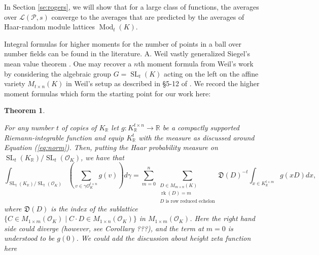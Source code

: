 \documentclass{amsart}
\newtheorem{theorem}{Theorem}
\newcommand{\OK}{\mathcal{O}_K}
\DeclareMathOperator{\SL}{SL}
\DeclareMathOperator{\ML}{Mod}
\DeclareMathOperator{\rank}{rk}
\newcommand{\nihar}{\color{red}}
\begin{document}
In Section \ref{se:rogers}, we will show that for a large class of functions, the averages over $\mathcal{L}(\mathcal{P},s)$
converge to the 
averages that are predicted by the averages of Haar-random module lattices $\ML_{t}(K)$.


\label{se:average_over_lattice}



\iffalse
Integral formulas for higher moments for the number of points in a ball
over number fields can be found in the literature. A. Weil vastly generalized 
Siegel's mean value theorem \cite{WeilSiegelformula}. One may recover a $n${th} moment formula from Weil's work by considering the algebraic group $G = \SL_{t}(K)$ acting on the left on the affine variety $M_{t \times n}(K)$ in Weil's setup as described in \S 5-12 of \cite{WeilSiegelformula}. 
We record the higher moment formulas which form the starting point for our work here: 
\begin{theorem} {\cite{K19,WeilSiegelformula,hughes2023mean} }


\label{th:weil}
For any number $t$ of copies of $K_\mathbb{R}$ let $g:K_{\mathbb{R}}^{t \times n} \rightarrow \mathbb{R}$ be a compactly supported Riemann-integrable function and equip $K_\mathbb{R}^t$ with the measure as discussed around Equation (\ref{eq:norm}). Then, putting the Haar probability measure on $\SL_{t}(K_\mathbb{R})/\SL_{t}(\OK)$, we have that
\begin{equation}
\int_{\SL_{t}(K_\mathbb{R})/\SL_{t}(\OK)} \left(\sum_{v \in \gamma \mathcal{O}_K^{ t \times n}} g(v)  \right) d \gamma
=
	\sum_{m=0}^{{n}}\sum_{\substack{D \in M_{m \times n }(K) \\ 
\rank(D) = m \\ 
D \text{ is row reduced echelon}}}
\mathfrak{D}(D)^{-t} \int_{x \in K_\mathbb{R}^{t \times m }} g(x D ) dx,
\end{equation}
where $\mathfrak{D}(D)$ is the index of the sublattice 
$\{ C \in M_{1 \times m }(\mathcal{O}_K) \mid C \cdot D \in M_{1 \times n}(\mathcal{O}_K)\}$ in $M_{1 \times m}(\mathcal{O}_K)$. 
Here the right hand side could diverge (however, see Corollary ???), and the term at $m=0$ is understood to be $g(0)$.
{\nihar  We could add the discussion about height zeta function here }
\end{theorem}
\end{document}
